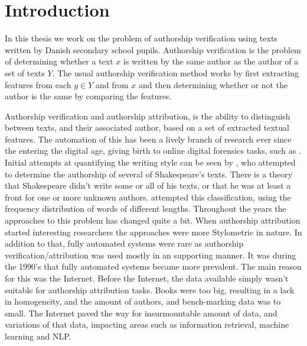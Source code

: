 \section{Introduction} \label{sec:introduction}

In this thesis we work on the problem of authorship verification using texts
written by Danish secondary school pupils. Authorship verification is the
problem of determining whether a text $x$ is written by the same author as the
author of a set of texts $Y$. The usual authorship verification method works by
first extracting features from each $y \in Y$ and from $x$ and then determining
whether or not the author is the same by comparing the features.

Authorship verification and authorship attribution, is the ability to
distinguish between texts, and their associated author, based on a set of
extracted textual features. The automation of this has been a lively branch of
research ever since the entering the digital age, giving birth to online digital
forensics tasks, such as \cite{pan:2015}. Initial attempts at quantifying the
writing style can be seen by \cite{Mendenhall237}, who attempted to determine
the authorship of several of Shakespeare's texts. There is a theory that
Shakespeare didn't write some or all of his texts, or that he was at least a
front for one or more unknown authors. \cite{Mendenhall237} attempted this
classification, using the frequency distribution of words of different lengths.
Throughout the years the approaches to this problem has changed quite a bit.
When authorship attribution started interesting researchers the approaches were
more Stylometric in nature. In addition to that, fully automated systems were
rare as authorship verification/attribution was used mostly in an supporting
manner. It was during the 1990's that fully automated systems became more
prevalent. The main reason for this was the Internet. Before the Internet, the
data available simply wasn't suitable for authorship attribution tasks. Books
were too big, resulting in a lack in homogeneity, and the amount of authors, and
bench-marking data was to small. The Internet paved the way for insurmountable
amount of data, and variations of that data, impacting areas such as information
retrieval, machine learning and \gls{NLP}.

